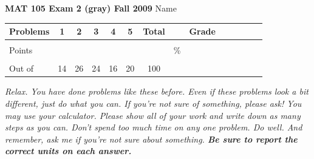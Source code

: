 \documentclass[12pt]{article}
\begin{document}
\textbf{MAT 105 Exam 2 (gray) Fall 2009} \hspace{.4in} {\large Name} \hrulefill

\begin{center}

\begin{tabular}
{|l|c|c|c|c|c|c|c|c|c|c|c|c|c|} \hline

 Problems & \hspace{5 pt} 1 \hspace{5 pt}  & \hspace{5 pt} 2 \hspace{5 pt} & \hspace{5 pt} 3  \hspace{5 pt} & \hspace{5 pt} 4  \hspace{5 pt} & \hspace{5 pt}5 \hspace{5 pt} & \hspace{5 pt} Total  \hspace{5 pt} & &  \hspace{5 pt} Grade \hspace{5 pt}  \\ \hline
&&&&&&&&\\  
Points &&&&&&&    \hspace{.8in}\% &  \\ 
&&&&&&&& \\  \hline
Out of & 14 & 26 & 24  & 16 & 20 &100 & & \\ \hline

\end {tabular}

\end{center}

\vspace{.2in}

 \emph{Relax.  You have done problems like these before.  Even if these problems look a bit different, just do what you can.  If you're not sure of something, please ask! You may use your calculator.  Please show all of your work and write down as many steps as you can.  Don't spend too much time on any one problem.  Do well.  And remember, ask me if you're not sure about something.  \textbf{Be sure to report the correct units on each answer.}}

\hrulefill
\end{document}
